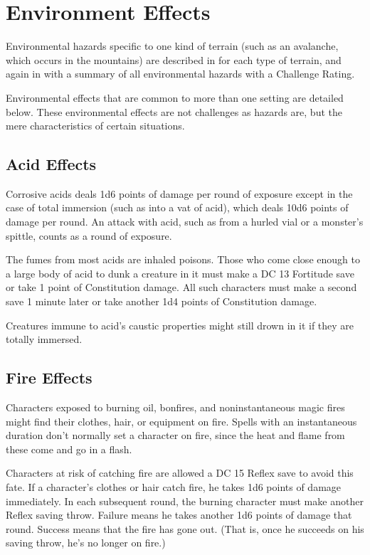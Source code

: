 \section{Environment Effects}
Environmental hazards specific to one kind of terrain (such as an avalanche, which occurs in the mountains) are described in  for each type of terrain, and again in  with a summary of all environmental hazards with a Challenge Rating.

Environmental effects that are common to more than one setting are detailed below. These environmental effects are not challenges as hazards are, but the mere characteristics of certain situations.


\subsection{Acid Effects}
Corrosive acids deals 1d6 points of damage per round of exposure except in the case of total immersion (such as into a vat of acid), which deals 10d6 points of damage per round. An attack with acid, such as from a hurled vial or a monster's spittle, counts as a round of exposure.

The fumes from most acids are inhaled poisons. Those who come close enough to a large body of acid to dunk a creature in it must make a DC 13 Fortitude save or take 1 point of Constitution damage. All such characters must make a second save 1 minute later or take another 1d4 points of Constitution damage.

Creatures immune to acid's caustic properties might still drown in it if they are totally immersed.


\subsection{Fire Effects}
Characters exposed to burning oil, bonfires, and noninstantaneous magic fires might find their clothes, hair, or equipment on fire. Spells with an instantaneous duration don't normally set a character on fire, since the heat and flame from these come and go in a flash.

Characters at risk of catching fire are allowed a DC 15 Reflex save to avoid this fate. If a character's clothes or hair catch fire, he takes 1d6 points of damage immediately. In each subsequent round, the burning character must make another Reflex saving throw. Failure means he takes another 1d6 points of damage that round. Success means that the fire has gone out. (That is, once he succeeds on his saving throw, he's no longer on fire.)

